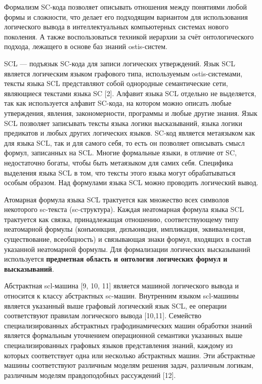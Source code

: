 Формализм SC-кода позволяет описывать отношения между понятиями любой формы и сложности, что делает его подходящим вариантом для использования логического вывода в интеллектуальных компьютерных системах нового поколения. А также воспользоваться техникой иерархии за счёт онтологического подхода, лежащего в основе баз знаний ostis-систем.

SCL — подъязык SC-кода для записи логических утверждений. Язык SCL является логическим языком графового типа, используемым ostis-системами, тексты языка SCL представляют собой однородные семантические сети, являющиеся текстами языка SC [2]. Алфавит языка SCL отдельно не выделяется, так как используется алфавит SC-кода, на котором можно описать любые утверждения, явления, закономерности, программы и любые другие знания. Язык SCL позволяет записывать тексты языка логики высказываний, языка логики предикатов и любых других логических языков. SC-код является метаязыком как для языка SCL, так и для самого себя, то есть он позволяет описывать смысл формул, записанных на SCL. Многие формальные языки, в отличие от SC, недостаточно богаты, чтобы быть метаязыком для самих себя. Специфика выделения языка SCL в том, что тексты этого языка могут обрабатываться особым образом. Над формулами языка SCL можно проводить логический вывод.

Атомарная формула языка SCL трактуется как множество всех символов некоторого sc-текста (sc-структура). Каждая неатомарная формула языка SCL трактуется как связка, принадлежащая отношению, соответствующему типу неатомарной формулы (конъюнкция, дизъюнкция, импликация, эквиваленция, существование, всеобщность) и связывающая знаки формул, входящих в состав указанной неатомарной формулы. Для формализации логических высказываний используется \textbf{предметная область и онтология логических формул и высказываний}.

Абстрактная scl-машина [9, 10, 11] является машиной логического вывода и относится к классу абстрактных sc-машин. Внутренним языком scl-машины является указанный выше графовый логический язык SCL, ее операции соответствуют правилам логического вывода [10,11]. Семейство специализированных абстрактных графодинамических машин обработки знаний является формальным уточнением операционной семантики указанных выше специализированных графовых языков представления знаний, каждому из которых соответствует одна или несколько абстрактных машин. Эти абстрактные машины соответствуют различным моделям решения задач, различным логикам, различным моделям правдоподобных рассуждений [12].

